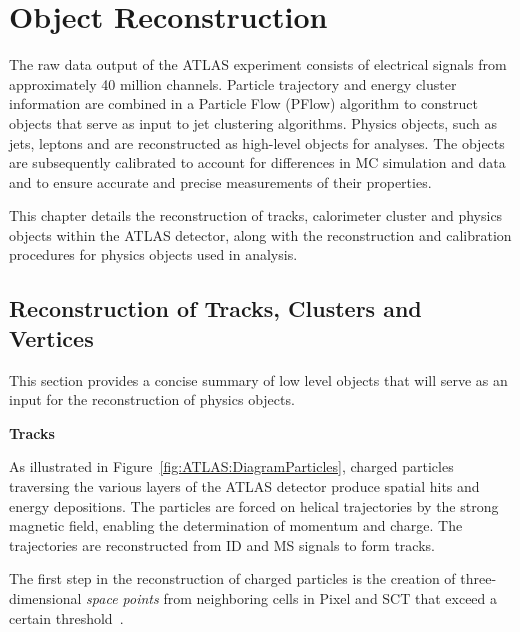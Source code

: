 \chapter{Object Reconstruction}
\label{chap:ObjectReco}

The raw data output of the ATLAS experiment consists of electrical signals from approximately 40 million channels. 
Particle trajectory and energy cluster information are combined in a Particle Flow (PFlow) algorithm to construct objects that serve as input to jet clustering algorithms.
Physics objects, such as jets, leptons and \ETmiss are reconstructed as high-level objects for analyses. The objects are subsequently calibrated to account for differences
in MC simulation and data and to ensure accurate and precise measurements of their
properties.

This chapter details the reconstruction of tracks, calorimeter cluster and physics objects within the ATLAS detector,
along with the reconstruction and calibration
procedures for physics objects used in analysis.

\section{Reconstruction of Tracks, Clusters and Vertices}
\label{sec:ObjRecl:Tracks}
This section provides a concise summary of low level objects that will serve as an input for the reconstruction of physics objects.

\vspace{.5cm}
\noindent
\textbf{Tracks}
\vspace{.5cm}

\noindent
As illustrated in Figure~\ref{fig:ATLAS:DiagramParticles}, charged particles traversing
the various layers of the ATLAS detector produce spatial hits and energy depositions.
The particles are forced on helical trajectories by the
strong magnetic field, enabling the determination of momentum and charge.
The trajectories are reconstructed from ID and MS signals to form tracks.

The first step in the reconstruction of charged particles is the creation of three-dimensional \textit{space points} from neighboring cells in Pixel and SCT that exceed a certain threshold~\cite{PERF-2015-08}.

